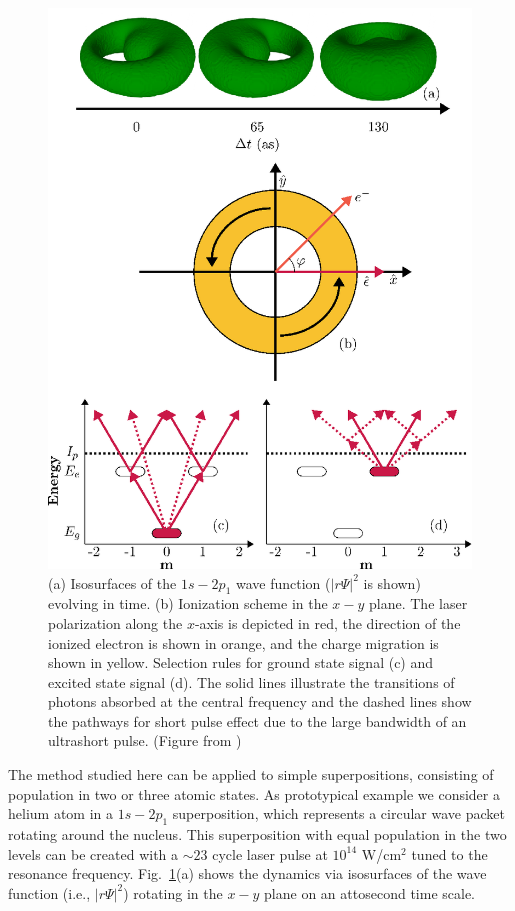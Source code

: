 \begin{figure}[!ht]
\centering
\includegraphics[width=0.7\linewidth]{figs/Photo_ionization/superpositions/Venzke_new_fig_1.eps}
\caption{(a) Isosurfaces of the $1s-2p_1$ wave function ($|r\Psi|^2$ is shown) evolving in time. (b) Ionization scheme in the $x-y$ plane. The laser polarization along the $x$-axis is depicted in red, the direction of the ionized electron is shown in orange, and the charge migration is shown in yellow. Selection rules for ground state signal (c) and excited state signal (d). The solid lines illustrate the transitions of photons absorbed at the central frequency and the dashed lines show the pathways for short pulse effect due to the large bandwidth of an ultrashort pulse. (Figure from \cite{venzke2021_wave})
} 
  \label{fig:dynamic_visualization}
\end{figure}

The method studied here can be applied to simple superpositions, consisting of population in two or three atomic states. As prototypical example we consider a helium atom in a $1s-2p_1$ superposition, which represents a circular wave packet rotating around the nucleus. This superposition with equal population in the two levels can be created with a $\sim23$ cycle laser pulse at $10^{14}$ W/cm$^2$ tuned to the resonance frequency. Fig.~\ref{fig:dynamic_visualization}(a) shows the dynamics via isosurfaces of the wave function (i.e., $\left|r\Psi\right|^2$) rotating in the $x-y$ plane on an attosecond time scale. 

